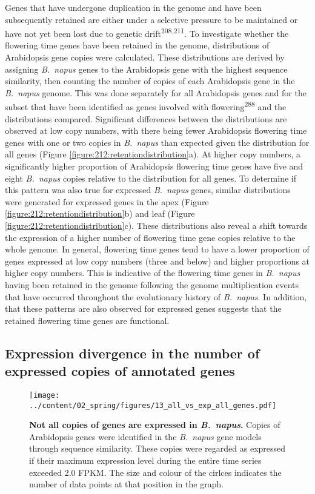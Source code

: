 \documentclass[12pt,]{book}
\begin{document}
Genes that have undergone duplication in the genome and have been
subsequently retained are either under a selective pressure to be
maintained or have not yet been lost due to genetic
drift\textsuperscript{208,211}. To investigate whether the flowering
time genes have been retained in the genome, distributions of
Arabidopsis gene copies were calculated. These distributions are derived
by assigning \emph{B.~napus} genes to the Arabidopsis gene with the
highest sequence similarity, then counting the number of copies of each
Arabidopsis gene in the \emph{B.~napus} genome. This was done separately
for all Arabidopsis genes and for the subset that have been identified
as genes involved with flowering\textsuperscript{288} and the
distributions compared. Significant differences between the
distributions are observed at low copy numbers, with there being fewer
Arabidopsis flowering time genes with one or two copies in
\emph{B.~napus} than expected given the distribution for all genes
(Figure \ref{figure:212:retentiondistribution}a). At higher copy
numbers, a significantly higher proportion of Arabidopsis flowering time
genes have five and eight \emph{B.~napus} copies relative to the
distribution for all genes. To determine if this pattern was also true
for expressed \emph{B.~napus} genes, similar distributions were
generated for expressed genes in the apex (Figure
\ref{figure:212:retentiondistribution}b) and leaf (Figure
\ref{figure:212:retentiondistribution}c). These distributions also
reveal a shift towards the expression of a higher number of flowering
time gene copies relative to the whole genome. In general, flowering
time genes tend to have a lower proportion of genes expressed at low
copy numbers (three and below) and higher proportions at higher copy
numbers. This is indicative of the flowering time genes in
\emph{B.~napus} having been retained in the genome following the genome
multiplication events that have occurred throughout the evolutionary
history of \emph{B.~napus}. In addition, that these patterns are also
observed for expressed genes suggests that the retained flowering time
genes are functional.

\subsection{Expression divergence in the number of expressed copies of
annotated genes}\label{section:spring:expressedvsannotated}

\begin{figure}[htbp]
\centering
\texttt{[image: ../content/02\_spring/figures/13\_all\_vs\_exp\_all\_genes.pdf]}
\caption{\textbf{Not all copies of genes are expressed in
\emph{B.~napus}.} Copies of Arabidopsis genes were identified in the
\emph{B.~napus} gene models through sequence similarity. These copies
were regarded as expressed if their maximum expression level during the
entire time series exceeded 2.0 FPKM. The size and colour of the cirlces
indicates the number of data points at that position in the
graph.}\label{figure:213:allvsexp}
\end{figure}
\end{document}
